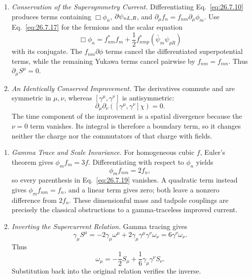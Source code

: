 \begin{enumerate}
  \begin{enumerate}
    \item \emph{Conservation of the Supersymmetry Current.}
    Differentiating Eq.~\eqref{eq:26.7.10} produces terms containing
      \(\Box\phi_n\), \(\sl{\partial}\psi_{nL,R}\), and
      \(\partial_\mu f_n=f_{nm}\partial_\mu\phi_m\).
      Use Eq.~\eqref{eq:26.7.17} for the fermions and the scalar equation
      \[
        \Box\phi_n=f_{nm}^*f_m
          +\frac12f_{nmp}^*(\bar\psi_m\psi_{pR})
      \]
      with its conjugate.  The \(f_{nm}\partial\phi\) terms cancel the
      differentiated superpotential terms, while the remaining Yukawa terms
      cancel pairwise by \(f_{nm}=f_{mn}\).  Thus
      \(\partial_\mu S^\mu=0\).
    \item \emph{An Identically Conserved Improvement.}
    The derivatives commute and are symmetric in \(\mu,\nu\), whereas
      \([\gamma^\mu,\gamma^\nu]\) is antisymmetric:
      \[
        \partial_\mu\partial_\nu
          ([\gamma^\mu,\gamma^\nu]\chi)=0.
      \]
      The time component of the improvement is a spatial divergence because
      the \(\nu=0\) term vanishes.  Its integral is therefore a boundary term,
      so it changes neither the charge nor the commutators of that charge with
      fields.
  \end{enumerate}

  \begin{enumerate}
    \item \emph{Gamma Trace and Scale Invariance.}
    For homogeneous cubic \(f\), Euler's theorem gives
      \(\phi_mf_m=3f\).  Differentiating with respect to \(\phi_n\) yields
      \[
        \phi_m f_{nm}=2f_n,
      \]
      so every parenthesis in Eq.~\eqref{eq:26.7.19} vanishes.  A quadratic
      term instead gives \(\phi_mf_{nm}=f_n\), and a linear term gives zero;
      both leave a nonzero difference from \(2f_n\).  These dimensionful mass
      and tadpole couplings are precisely the classical obstructions to a
      gamma-traceless improved current.
    \item \emph{Inverting the Supercurrent Relation.}
    Gamma tracing gives
      \[
        \gamma_\mu S^\mu
          =-2\gamma_\mu\omega^\mu
           +2\gamma_\mu\gamma^\mu\gamma^\nu\omega_\nu
          =6\gamma^\nu\omega_\nu.
      \]
      Thus
      \[
        \omega_\mu=-\frac12S_\mu
          +\frac16\gamma_\mu\gamma^\nu S_\nu.
      \]
      Substitution back into the original relation verifies the inverse.
  \end{enumerate}


\end{enumerate}
